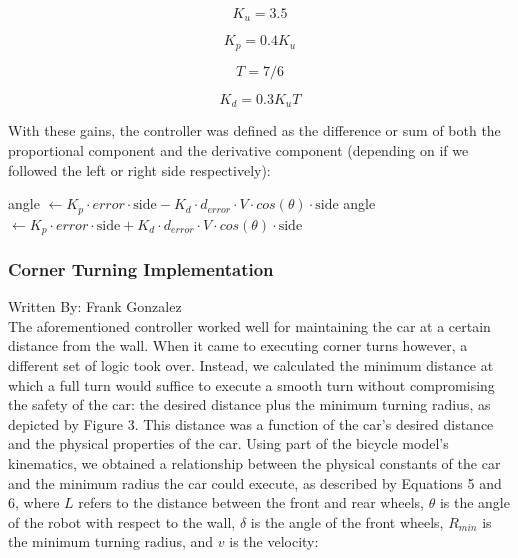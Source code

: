 \documentclass{article}
\begin{document}
\begin{equation}
    K_u = 3.5
\end{equation}

\begin{equation}
    K_p = 0.4K_u
\end{equation}

\begin{equation}
    T = 7/6
\end{equation}

\begin{equation}
    K_d = 0.3K_uT
\end{equation}

With these gains, the controller was defined as the difference or sum of both the proportional component and the derivative component (depending on if we followed the left or right side respectively):
\newline

\begin{algorithmic}
        \STATE angle $\gets K_p \cdot error \cdot \text{side} - K_d \cdot d_{error} \cdot V \cdot cos(\theta) \cdot \text{side}$
\ELSE
        \STATE angle $\gets K_p \cdot error \cdot \text{side} + K_d \cdot d_{error} \cdot V \cdot cos(\theta) \cdot \text{side}$
\ENDIF
\end{algorithmic}


\subsubsection{Corner Turning Implementation}
Written By: Frank Gonzalez\\

The aforementioned controller worked well for maintaining the car at a certain distance from the wall. When it came to executing corner turns however, a different set of logic took over. Instead, we calculated the minimum distance at which a full turn would suffice to execute a smooth turn without compromising the safety of the car: the desired distance plus the minimum turning radius, as depicted by Figure 3. This distance was a function of the car's desired distance and the physical properties of the car. Using part of the bicycle model's kinematics, we obtained a relationship between the physical constants of the car and the minimum radius the car could execute, as described by Equations 5 and 6, where $L$ refers to the distance between the front and rear wheels, $\theta$ is the angle of the robot with respect to the wall, $\delta$ is the angle of the front wheels, $R_{min}$ is the minimum turning radius, and $v$ is the velocity:
\newline
\end{document}
